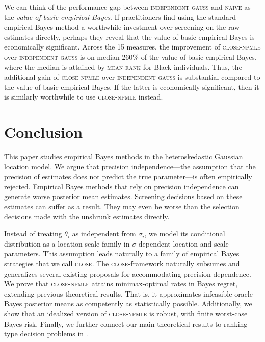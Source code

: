 \documentclass[12pt, reqno]{amsart}
\newcommand{\naive}{\textsc{naive}}
\newcommand{\meanrank}{\textsc{mean rank}}
\newcommand{\close}{\textsc{close}}
\newcommand{\npmle}{\textsc{npmle}}
\newcommand{\closenpmle}{\close-\npmle}
\newcommand{\indepgauss}{\textsc{independent-gauss}}
\numberwithin{equation}{section}
\begin{document}
 We can think of the performance gap between \indepgauss{} and \naive {} as the
 \emph{value of basic empirical Bayes}. If practitioners find using the standard empirical
 Bayes method a worthwhile investment over screening on the raw estimates directly,
 perhaps they reveal that the value of basic empirical Bayes is economically significant.
 Across the 15 measures, the improvement of \closenpmle{} over
 \indepgauss{} is on median 260\% of the value of basic empirical Bayes, where the median
 is attained by
 \meanrank{} for Black individuals. Thus, the additional gain of \closenpmle
  {} over \indepgauss{} is substantial compared to the value of basic empirical Bayes. If
  the latter is economically significant, then it is similarly worthwhile to use
  \closenpmle{} instead.





\section{Conclusion}
\label{sec:conclusion}

This paper studies empirical Bayes methods in the heteroskedastic Gaussian location model.
We argue that precision independence---the assumption that the precision of estimates does
not
predict the true parameter---is often empirically rejected. Empirical Bayes 
methods that rely on precision independence can generate worse posterior mean estimates.
Screening decisions based on these estimates can suffer as a result. They may even be
worse than the selection decisions made with the unshrunk estimates directly.

Instead of treating $\theta_i$ as independent from $\sigma_i$, we model its conditional
distribution as a location-scale family in $\sigma$-dependent location and scale
parameters. This assumption leads naturally to a family of empirical Bayes strategies
that we call \close. The \close-framework naturally subsumes and generalizes several
existing proposals for accommodating precision dependence. We prove that
\closenpmle{} attains minimax-optimal rates in Bayes regret, extending previous
theoretical results. That is, it approximates infeasible oracle Bayes posterior means as
competently as statistically possible. Additionally, we show that an idealized version of
\closenpmle{} is robust, with finite worst-case Bayes risk. Finally, we further connect
our main theoretical
results   to ranking-type decision problems in
\citet{bergman2019creating}. 
\end{document}
